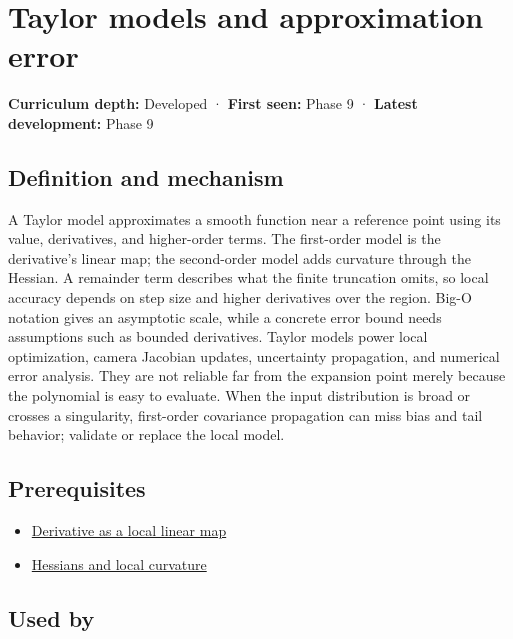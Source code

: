 \hypertarget{appendix-32f39e9a3738}{}\label{referencestart:appendix-32f39e9a3738}
\section{Taylor models and approximation error}\label{appendix-32f39e9a3738-taylor-models-and-approximation-error}

\textbf{Curriculum depth:} Developed · \textbf{First seen:} Phase 9 · \textbf{Latest development:} Phase 9

\subsection{Definition and mechanism}\label{appendix-32f39e9a3738-definition-and-mechanism}

A Taylor model approximates a smooth function near a reference point using its value, derivatives, and higher-order terms. The first-order model is the derivative's linear map; the second-order model adds curvature through the Hessian. A remainder term describes what the finite truncation omits, so local accuracy depends on step size and higher derivatives over the region. Big-O notation gives an asymptotic scale, while a concrete error bound needs assumptions such as bounded derivatives. Taylor models power local optimization, camera Jacobian updates, uncertainty propagation, and numerical error analysis. They are not reliable far from the expansion point merely because the polynomial is easy to evaluate. When the input distribution is broad or crosses a singularity, first-order covariance propagation can miss bias and tail behavior; validate or replace the local model.

\subsection{Prerequisites}\label{appendix-32f39e9a3738-prerequisites}

\begin{itemize}
\tightlist
\item
  \hyperref[appendix-7bc181935c42]{Derivative as a local linear map}
\item
  \hyperref[appendix-6ac071f8b50c]{Hessians and local curvature}
\end{itemize}

\subsection{Used by}\label{appendix-32f39e9a3738-used-by}

